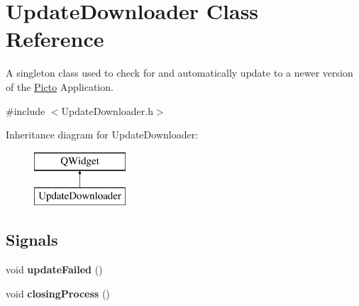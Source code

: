 \hypertarget{class_update_downloader}{\section{Update\-Downloader Class Reference}
\label{class_update_downloader}
}


A singleton class used to check for and automatically update to a newer version of the \hyperlink{namespace_picto}{Picto} Application.  




{\ttfamily \#include $<$Update\-Downloader.\-h$>$}

Inheritance diagram for Update\-Downloader\-:\begin{figure}[H]
\begin{center}
\leavevmode
\includegraphics[height=2.000000cm]{class_update_downloader}
\end{center}
\end{figure}
\subsection*{Signals}
\begin{DoxyCompactItemize}
\item 
\hypertarget{class_update_downloader_a2978bbfa5db48034ada16f1378a6dcc9}{void {\bfseries update\-Failed} ()}\label{class_update_downloader_a2978bbfa5db48034ada16f1378a6dcc9}

\item 
\hypertarget{class_update_downloader_a5f5178d9d8bdbd41f5486dfaeff63fc7}{void {\bfseries closing\-Process} ()}\label{class_update_downloader_a5f5178d9d8bdbd41f5486dfaeff63fc7}

\end{DoxyCompactItemize}
